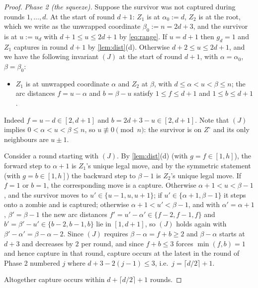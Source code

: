 \documentclass[11pt,a4paper]{article}
\theoremstyle{plain}
\theoremstyle{definition}
\theoremstyle{remark}
\providecommand{\tightlist}{\setlength{\itemsep}{0pt}\setlength{\parskip}{0pt}}
\begin{document}
\begin{proof}
\emph{Phase 2 (the squeeze).} Suppose the survivor was not captured during rounds $1,\dots,d$. At the start of round $d+1$: $Z_1$ is at $\alpha_0:=d$, $Z_2$ is at the root, which we write as the unwrapped coordinate $\beta_0:=n=2d+3$, and the survivor is at $u:=u_d$ with $d+1\le u\le2d+1$ by \eqref{eq:range}. If $u=d+1$ then $g_d=1$ and $Z_1$ captures in round $d+1$ by \cref{lem:dist}(d). Otherwise $d+2\le u\le2d+1$, and we have the following invariant $(J)$ at the start of round $d+1$, with $\alpha=\alpha_0$, $\beta=\beta_0$:
\begin{itemize}\tightlist
\item[$(J)$] $Z_1$ is at unwrapped coordinate $\alpha$ and $Z_2$ at $\beta$, with $d\le\alpha<u<\beta\le n$; the arc distances $f=u-\alpha$ and $b=\beta-u$ satisfy $1\le f\le d+1$ and $1\le b\le d+1$.
\end{itemize}
Indeed $f=u-d\in[2,d+1]$ and $b=2d+3-u\in[2,d+1]$. Note that $(J)$ implies $0<\alpha<u<\beta\le n$, so $u\not\equiv0\pmod n$: the survivor is on $Z^\circ$ and its only neighbours are $u\pm1$.

Consider a round starting with $(J)$. By \cref{lem:dist}(d) (with $g=f\in[1,h]$), the forward step to $\alpha+1$ is $Z_1$'s unique legal move, and by the symmetric statement (with $g=b\in[1,h]$) the backward step to $\beta-1$ is $Z_2$'s unique legal move. If $f=1$ or $b=1$, the corresponding move is a capture. Otherwise $\alpha+1<u<\beta-1$, and the survivor moves to $u'\in\{u-1,u,u+1\}$; if $u'\in\{\alpha+1,\beta-1\}$ it steps onto a zombie and is captured; otherwise $\alpha+1<u'<\beta-1$, and with $\alpha'=\alpha+1$, $\beta'=\beta-1$ the new arc distances $f'=u'-\alpha'\in\{f-2,f-1,f\}$ and $b'=\beta'-u'\in\{b-2,b-1,b\}$ lie in $[1,d+1]$, so $(J)$ holds again with $\beta'-\alpha'=\beta-\alpha-2$. Since $(J)$ requires $\beta-\alpha=f+b\ge2$ and $\beta-\alpha$ starts at $d+3$ and decreases by $2$ per round, and since $f+b\le3$ forces $\min(f,b)=1$ and hence capture in that round, capture occurs at the latest in the round of Phase 2 numbered $j$ where $d+3-2(j-1)\le3$, i.e.\ $j=\lceil d/2\rceil+1$.

Altogether capture occurs within $d+\lceil d/2\rceil+1$ rounds.
\end{proof}
\end{document}
